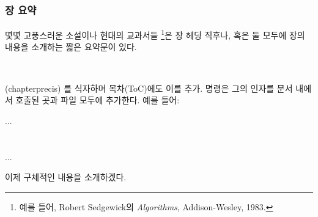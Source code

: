 
\subsection{장 요약}
\label{sec:chapter-precis}



몇몇 고풍스러운 소설이나 현대의 교과서들%
\footnote{예를 들어, Robert Sedgewick의 \textit{Algorithms},
	Addison-Wesley, 1983.}은
장 헤딩 직후나,
\toc 혹은 둘 모두에 장의 내용을 소개하는 짧은 요약문이 있다.


\begin{syntax}
\cmd{\chapterprecis} \\
\end{syntax}
\glossary(chapterprecis)%
  {}%
  {를 식자하며 목차(ToC)에도 이를 추가.}
\cmd{\chapterprecis} 명령은 그의 인자를 문서 내에서 호출된 곳과
 파일 모두에 추가한다. 예를 들어:
 \begin{lcode}
 ...
 \chapter{}%
 ...
 \end{lcode}

이제 구체적인 내용을 소개하겠다.

